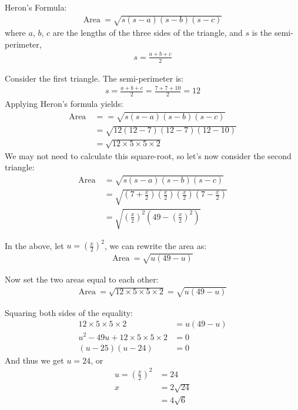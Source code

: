 \documentclass[12pt]{article}
\begin{document}
\begin{answer}
Heron's Formula:
\begin{align*}
\text{Area}~ 
= \sqrt{s(s-a)(s-b)(s-c)}
\end{align*}
where $a$, $b$, $c$ are the lengths of the three sides of the triangle, and $s$ is the semi-perimeter,
\begin{align*}
s = \frac{a+b+c}{2}
\end{align*}

Consider the first triangle. The semi-perimeter is:
\begin{align*}
s = \frac{a+b+c}{2} = \frac{7+7+10}{2} = 12
\end{align*}
Applying Heron's formula yields:
\begin{align*}
\text{Area}~ 
& = = \sqrt{s(s-a)(s-b)(s-c)} \\
& = \sqrt{12(12-7)(12-7)(12-10)} \\
& = \sqrt{12 \times 5 \times 5 \times 2}
\end{align*}
We may not need to calculate this square-root, so let's now consider the second triangle:
\begin{align*}
\text{Area}~ 
& = \sqrt{s(s-a)(s-b)(s-c)} \\
& = \sqrt{\left(7+\frac{x}{2}\right)\left(\frac{x}{2}\right)\left(\frac{x}{2}\right)\left(7-\frac{x}{2}\right)} \\
& = \sqrt{\left(\frac{x}{2}\right)^2  \left(49-\left(\frac{x}{2}\right)^2\right)}
\end{align*}

In the above, let $u=\left(\frac{x}{2}\right)^2$, we can rewrite the area as:
\begin{align*}
\text{Area}~ = \sqrt{u(49-u)}
\end{align*}

Now set the two areas equal to each other:
\begin{align*}
\text{Area}~ = \sqrt{12 \times 5 \times 5 \times 2} = \sqrt{u(49-u)} 
\end{align*}

Squaring both sides of the equality:
\begin{align*}
12 \times 5 \times 5 \times 2 & = u (49 -u) \\
u^2 - 49 u + 12 \times 5 \times 5 \times 2 & = 0\\
(u-25)(u-24) & = 0
\end{align*}
And thus we get $u=24$, or
\begin{align*}
u = \left(\frac{x}{2}\right)^2 & = 24 \\
x & = 2 \sqrt{24} \\
  & = 4 \sqrt{6}
\end{align*}

\end{answer}
\end{document}
